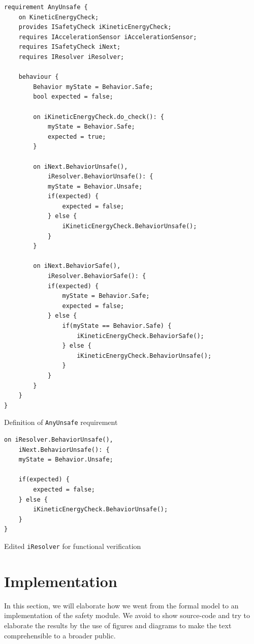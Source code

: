 \documentclass[12pt]{scrreprt}
\begin{document}
\begin{listing}
\begin{verbatim}
requirement AnyUnsafe {
	on KineticEnergyCheck;
	provides ISafetyCheck iKineticEnergyCheck;
	requires IAccelerationSensor iAccelerationSensor;
	requires ISafetyCheck iNext;
	requires IResolver iResolver;

    behaviour {
        Behavior myState = Behavior.Safe;
        bool expected = false;

        on iKineticEnergyCheck.do_check(): {
            myState = Behavior.Safe;
            expected = true;
        }

        on iNext.BehaviorUnsafe(),
            iResolver.BehaviorUnsafe(): {
            myState = Behavior.Unsafe;
            if(expected) {
                expected = false;
            } else {
                iKineticEnergyCheck.BehaviorUnsafe();
            }
        }

        on iNext.BehaviorSafe(),
            iResolver.BehaviorSafe(): {
            if(expected) {
                myState = Behavior.Safe;
                expected = false;
            } else {
                if(myState == Behavior.Safe) {
                    iKineticEnergyCheck.BehaviorSafe();
                } else {
                    iKineticEnergyCheck.BehaviorUnsafe();
                }
            }
        }
    }
}
\end{verbatim} 
\label{mfunctional_requirement}
\caption{Definition of \texttt{AnyUnsafe} requirement}
\end{listing}

\begin{listing}
\begin{verbatim}
on iResolver.BehaviorUnsafe(),
	iNext.BehaviorUnsafe(): {
	myState = Behavior.Unsafe;

	if(expected) {
	    expected = false;
	} else {
    	iKineticEnergyCheck.BehaviorUnsafe();
	}
}

\end{verbatim}

\label{modified_ke}
\caption{Edited \texttt{iResolver} for  functional verification}
\end{listing}


\newpage
\section{Implementation}
\label{Implementation}
In this section, we will elaborate how we went from the formal model to an implementation of the safety module. We avoid to show source-code and try to elaborate the results by the use of figures and diagrams to make the text comprehensible to a broader public.
\end{document}

